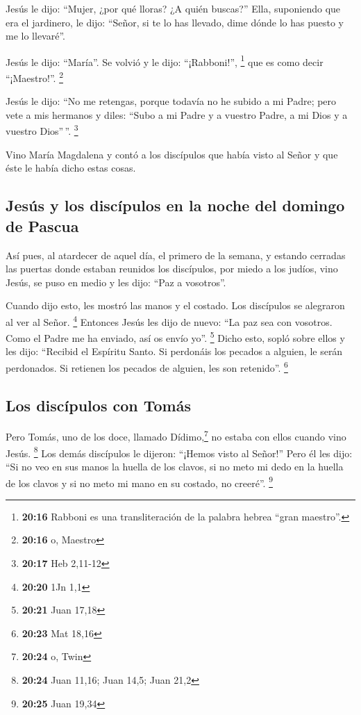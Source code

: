 \begin{paracol}{2}
 Jesús le dijo: ``Mujer, ¿por qué lloras? ¿A quién
buscas?'' Ella, suponiendo que era el jardinero, le dijo: ``Señor, si te
lo has llevado, dime dónde lo has puesto y me lo llevaré''.

 Jesús le dijo: ``María''. Se volvió y le dijo:
``¡Rabboni!'', \footnote{\textbf{20:16} Rabboni es una transliteración
  de la palabra hebrea ``gran maestro''.} que es como decir
``¡Maestro!''. \footnote{\textbf{20:16} o, Maestro}

 Jesús le dijo: ``No me retengas, porque todavía no he
subido a mi Padre; pero vete a mis hermanos y diles: ``Subo a mi Padre y
a vuestro Padre, a mi Dios y a vuestro Dios''\,''. \footnote{\textbf{20:17}
  Heb 2,11-12}

 Vino María Magdalena y contó a los discípulos que había
visto al Señor y que éste le había dicho estas cosas.

\hypertarget{jesuxfas-y-los-discuxedpulos-en-la-noche-del-domingo-de-pascua}{%
\subsection{Jesús y los discípulos en la noche del domingo de
Pascua}\label{jesuxfas-y-los-discuxedpulos-en-la-noche-del-domingo-de-pascua}}

 Así pues, al atardecer de aquel día, el primero de la
semana, y estando cerradas las puertas donde estaban reunidos los
discípulos, por miedo a los judíos, vino Jesús, se puso en medio y les
dijo: ``Paz a vosotros''.

 Cuando dijo esto, les mostró las manos y el costado. Los
discípulos se alegraron al ver al Señor. \footnote{\textbf{20:20} 1Jn
  1,1}  Entonces Jesús les dijo de nuevo: ``La paz sea
con vosotros. Como el Padre me ha enviado, así os envío yo''.
\footnote{\textbf{20:21} Juan 17,18}  Dicho esto, sopló
sobre ellos y les dijo: ``Recibid el Espíritu Santo.  Si
perdonáis los pecados a alguien, le serán perdonados. Si retienen los
pecados de alguien, les son retenido''. \footnote{\textbf{20:23} Mat
  18,16}

\hypertarget{los-discuxedpulos-con-tomuxe1s}{%
\subsection{Los discípulos con
Tomás}\label{los-discuxedpulos-con-tomuxe1s}}

 Pero Tomás, uno de los doce, llamado Dídimo,\footnote{\textbf{20:24}
  o, Twin} no estaba con ellos cuando vino Jesús. \footnote{\textbf{20:24}
  Juan 11,16; Juan 14,5; Juan 21,2}  Los demás discípulos
le dijeron: ``¡Hemos visto al Señor!'' Pero él les dijo: ``Si no veo en
sus manos la huella de los clavos, si no meto mi dedo en la huella de
los clavos y si no meto mi mano en su costado, no creeré''. \footnote{\textbf{20:25}
  Juan 19,34}


\end{paracol}
